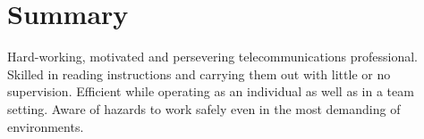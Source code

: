 \section{Summary}

\qquad Hard-working, motivated and persevering telecommunications professional. Skilled in reading instructions and carrying them out with little or no supervision. Efficient while operating as an individual as well as in a team setting. Aware of hazards to work safely even in the most demanding of environments.